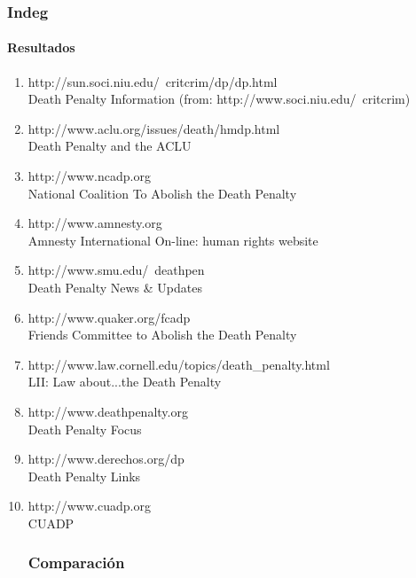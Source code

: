 \subsubsection{Indeg}

\paragraph{Resultados}
\begin{enumerate}
\item
http://sun.soci.niu.edu/~critcrim/dp/dp.html\\
Death Penalty Information (from: http://www.soci.niu.edu/~critcrim)\\
\item
http://www.aclu.org/issues/death/hmdp.html\\
Death Penalty and the ACLU\\
\item
http://www.ncadp.org\\
National Coalition To Abolish the Death Penalty\\
\item
http://www.amnesty.org\\
Amnesty International On-line: human rights website\\
\item
http://www.smu.edu/~deathpen\\
Death Penalty News & Updates\\
\item
http://www.quaker.org/fcadp\\
Friends Committee to Abolish the Death Penalty\\
\item
http://www.law.cornell.edu/topics/death_penalty.html\\
LII: Law about...the Death Penalty\\
\item
http://www.deathpenalty.org\\
Death Penalty Focus\\
\item
http://www.derechos.org/dp\\
Death Penalty Links\\
\item
http://www.cuadp.org\\
CUADP\\

\subsubsection{Comparación}


\end{enumerate}

